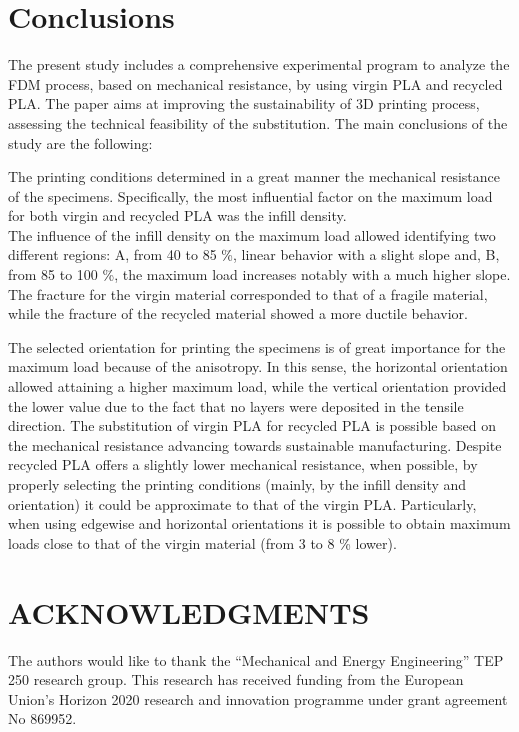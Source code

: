 \documentclass[conference,final,]{IEEEtran}
\begin{document}
\hypertarget{conclusions}{%
\section{Conclusions}\label{conclusions}}

The present study includes a comprehensive experimental program to
analyze the FDM process, based on mechanical resistance, by using virgin
PLA and recycled PLA. The paper aims at improving the sustainability of
3D printing process, assessing the technical feasibility of the
substitution. The main conclusions of the study are the following:

The printing conditions determined in a great manner the mechanical
resistance of the specimens. Specifically, the most influential factor
on the maximum load for both virgin and recycled PLA was the infill
density.\\
The influence of the infill density on the maximum load allowed
identifying two different regions: A, from 40 to 85 \%, linear behavior
with a slight slope and, B, from 85 to 100 \%, the maximum load
increases notably with a much higher slope. The fracture for the virgin
material corresponded to that of a fragile material, while the fracture
of the recycled material showed a more ductile behavior.

The selected orientation for printing the specimens is of great
importance for the maximum load because of the anisotropy. In this
sense, the horizontal orientation allowed attaining a higher maximum
load, while the vertical orientation provided the lower value due to the
fact that no layers were deposited in the tensile direction. The
substitution of virgin PLA for recycled PLA is possible based on the
mechanical resistance advancing towards sustainable manufacturing.
Despite recycled PLA offers a slightly lower mechanical resistance, when
possible, by properly selecting the printing conditions (mainly, by the
infill density and orientation) it could be approximate to that of the
virgin PLA. Particularly, when using edgewise and horizontal
orientations it is possible to obtain maximum loads close to that of the
virgin material (from 3 to 8 \% lower).

\hypertarget{acknowledgments}{%
\section{ACKNOWLEDGMENTS}\label{acknowledgments}}

The authors would like to thank the ``Mechanical and Energy
Engineering'' TEP 250 research group. This research has received funding
from the European Union's Horizon 2020 research and innovation programme
under grant agreement No 869952.
\end{document}
